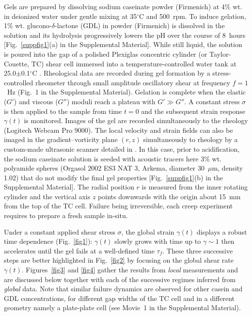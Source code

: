 \documentclass[twocolumn,superscriptaddress,showpacs,preprintnumbers,amsmath,amssymb,prl]{revtex4}
\newcommand\gp{\dot\gamma}
\begin{document}
Gels are prepared by dissolving sodium caseinate powder (Firmenich) at 4\% wt. in deionized water under gentle mixing at 35$^{\circ}$C and 500~rpm. To induce gelation, 1\% wt. glucono-$\delta$-lactone (GDL) in powder (Firmenich) is dissolved in the solution and its hydrolysis progressively lowers the pH over the course of 8~hours [Fig.~\ref{suppfig1}(a) in the Supplemental Material]. While still liquid, the solution is poured into the gap of a polished Plexiglas concentric cylinder (or Taylor-Couette, TC) shear cell immersed into a temperature-controlled water tank at 25.0$\pm$0.1$^{\circ}$C \cite{note}. Rheological data are recorded during gel formation by a stress-controlled rheometer through small amplitude oscillatory shear at frequency $f=1$~Hz (Fig.~1 in the Supplemental Material). Gelation is complete when the elastic ($G'$) and viscous ($G''$) moduli reach a plateau with $G'\gg G''$. A constant stress $\sigma$ is then applied to the sample from time $t=0$ and the subsequent strain response $\gamma(t)$ is monitored. Images of the gel are recorded simultaneously to the rheology (Logitech Webcam Pro 9000). The local velocity and strain fields can also be imaged in the gradient--vorticity plane $(r,z)$ simultaneously to rheology by a custom-made ultrasonic scanner detailed in \cite{Gallot:2013}. In this case, prior to acidification, the sodium caseinate solution is seeded with acoustic tracers here 3\% wt. polyamide spheres (Orgasol 2002 ES3 NAT 3, Arkema, diameter 30~$\mu$m, density 1.02) that do not modify the final gel properties [Fig.~\ref{suppfig1}(b) in the Supplemental Material]. The radial position $r$ is measured from the inner rotating cylinder and the vertical axis $z$ points downwards with the origin about 15~mm from the top of the TC cell. Failure being irreversible, each creep experiment requires to prepare a fresh sample in-situ.  

Under a constant applied shear stress $\sigma$, the global strain $\gamma(t)$ displays a robust time dependence (Fig.~\ref{fig1}): $\gamma(t)$ slowly grows with time up to $\gamma \sim 1$ then accelerates until the gel fails at a well-defined time $\tau_f$. These three successive steps are better highlighted in Fig.~\ref{fig2} by focusing on the global shear rate $\gp(t)$. Figures~\ref{fig3} and \ref{fig4} gather the results from {\it local} measurements and are discussed below together with each of the successive regimes inferred from {\it global} data. Note that similar failure dynamics are observed for other casein and GDL concentrations, for different gap widths of the TC cell and in a different geometry namely a plate-plate cell (see Movie~1 in the Supplemental Material).
\end{document}
